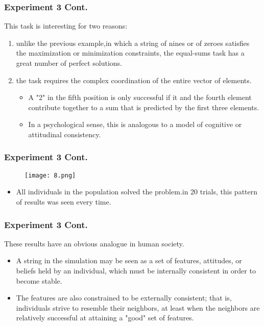 \documentclass[CJK]{beamer}
\begin{document}
\begin{CJK*}{GBK}{song}
\begin{frame}
\frametitle{Experiment 3 Cont.}
This task is interesting for two reasons:
\begin{enumerate}
\item{unlike the previous example,in which a string of nines or of zeroes satisfies the maximization or minimization constraints, the equal-sums task has a great number of perfect solutions.}
\item{the task requires the complex coordination of the entire vector of elements.}
\begin{itemize}
\item{ A "2" in the fifth position is only successful if it and the fourth element contribute together to a sum that is predicted by the first three elements.}
\item{In a psychological sense, this is analogous to a model of cognitive or attitudinal consistency.}
\end{itemize}
\end{enumerate}
\end{frame}

\begin{frame}
\frametitle{Experiment 3 Cont.}
\begin{figure}
\texttt{[image: 8.png]}
\end{figure}
\begin{itemize}
\item{All individuals in the population solved the problem.in 20 trials, this pattern of results was seen every time.}
\end{itemize}
\end{frame}

\begin{frame}
\frametitle{Experiment 3 Cont.}
These results have an obvious analogue in human society.
\begin{itemize}
\item{A string in the simulation may be seen as a set of features, attitudes, or beliefs held by an individual, which must be internally consistent in order to become stable.}
\item{The features are also constrained to be externally consistent; that is, individuals strive to resemble their neighbors, at least when the neighbors are relatively successful at attaining a "good" set of features.}
\end{itemize}
\end{frame}


\end{CJK*}
\end{document}
